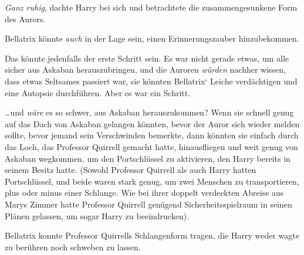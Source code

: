 \emph{Ganz ruhig}, dachte Harry bei sich und betrachtete die zusammengesunkene Form des Aurors.

Bellatrix könnte \emph{auch} in der Lage sein, einen Erinnerungszauber hinzubekommen.

Das könnte jedenfalls der erste Schritt sein. Es war nicht gerade etwas, um alle sicher aus Askaban herauszubringen, und die Auroren \emph{würden} nachher wissen, dass etwas Seltsames passiert war, sie könnten Bellatrix‘ Leiche verdächtigen und eine Autopsie durchführen. Aber es war ein Schritt.

…und \emph{wäre} es so schwer, aus Askaban herauszukommen? Wenn sie schnell genug auf das Dach von Askaban gelangen könnten, bevor der Auror sich wieder melden sollte, bevor jemand sein Verschwinden bemerkte, dann könnten sie einfach durch das Loch, das Professor Quirrell gemacht hatte, hinausfliegen und weit genug von Askaban wegkommen, um den Portschlüssel zu aktivieren, den Harry bereits in seinem Besitz hatte. (Sowohl Professor Quirrell als auch Harry hatten Portschlüssel, und beide waren stark genug, um zwei Menschen zu transportieren, plus oder minus einer Schlange. Wie bei ihrer doppelt verdeckten Abreise aus Marys Zimmer hatte Professor Quirrell genügend Sicherheitsspielraum in seinen Plänen gelassen, um sogar Harry zu beeindrucken).

Bellatrix konnte Professor Quirrells Schlangenform tragen, die Harry weder wagte zu berühren noch schweben zu lassen.

